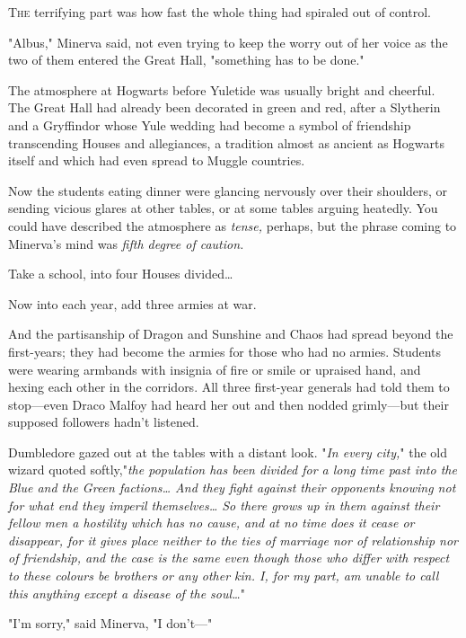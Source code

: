 
\lettrine{T}{he} terrifying part was how fast the whole thing had spiraled out of control.

"Albus," Minerva said, not even trying to keep the worry out of her voice as
the two of them entered the Great Hall, "something has to be done."

The atmosphere at Hogwarts before Yuletide was usually bright and cheerful. The
Great Hall had already been decorated in green and red, after a Slytherin and a
Gryffindor whose Yule wedding had become a symbol of friendship transcending
Houses and allegiances, a tradition almost as ancient as Hogwarts itself and
which had even spread to Muggle countries.

Now the students eating dinner were glancing nervously over their shoulders, or
sending vicious glares at other tables, or at some tables arguing heatedly. You
could have described the atmosphere as \emph{tense,} perhaps, but the phrase
coming to Minerva's mind was \emph{fifth degree of caution.}

Take a school, into four Houses divided{\ldots}

Now into each year, add three armies at war.

And the partisanship of Dragon and Sunshine and Chaos had spread beyond the
first-years; they had become the armies for those who had no armies. Students
were wearing armbands with insignia of fire or smile or upraised hand, and
hexing each other in the corridors. All three first-year generals had told them
to stop---even Draco Malfoy had heard her out and then nodded grimly---but
their supposed followers hadn't listened.

Dumbledore gazed out at the tables with a distant look. "\emph{In every city,}"
the old wizard quoted softly,"\emph{the population has been divided for a long
time past into the Blue and the Green factions{\ldots} And they fight against
their opponents knowing not for what end they imperil themselves{\ldots} So
there grows up in them against their fellow men a hostility which has no cause,
and at no time does it cease or disappear, for it gives place neither to the
ties of marriage nor of relationship nor of friendship, and the case is the
same even though those who differ with respect to these colours be brothers or
any other kin. I, for my part, am unable to call this anything except a disease
of the soul{\ldots}}"

"I'm sorry," said Minerva, "I don't---"

